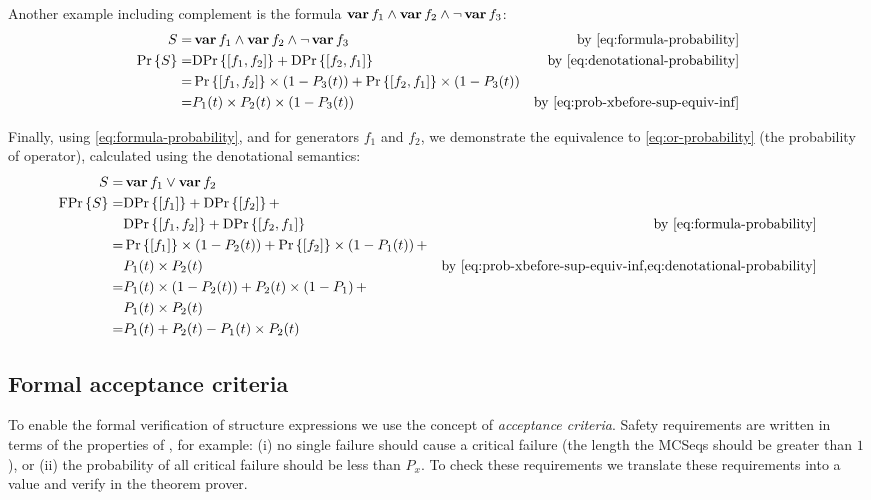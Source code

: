 \documentclass[12pt,openright,twoside,a4paper,oldfontcommands,english,brazil,final]{abntex2}
\theoremstyle{theo}
\def\varop{\ensuremath\operatorname{\mathbf{var}}}
\newcommand{\var}[1]{\ensuremath\varop #1}
\def\probabilityop{\ensuremath \Pr}
\newcommand{\probability}[1]{\ensuremath \probabilityop\left\{#1\right\}}
\def\denotationalprobop{\ensuremath\mathrm{DPr}}
\newcommand{\denotationalprob}[1]{\ensuremath \denotationalprobop\left\{#1\right\}}
\def\formulaprobop{\ensuremath\mathrm{FPr}}
\newcommand{\formulaprob}[1]{\ensuremath \formulaprobop\left\{#1\right\}}
\newcommand{\vari}[1]{\ensuremath\var{f_{#1}}}
\begin{document}
Another example including complement is the formula $\var{f_1} \land \var{f_2} \land \lnot \var{f_3}$:
%
\begin{align}
S = & \var{f_1} \land \var{f_2} \land \lnot \var{f_3}
  & \text{by \cref{eq:formula-probability}}\nonumber\\
\probability{S} = &
\denotationalprob{\left[f_1,f_2\right]} + \denotationalprob{\left[f_2,f_1\right]} 
  & \text{by \cref{eq:denotational-probability}}\nonumber\\
= & \probability{\left[f_1,f_2\right]}\times \left(1 - P_3(t)\right)
+ \probability{\left[f_2,f_1\right]}\times \left(1 - P_3(t)\right)\nonumber\\
= & P_1(t) \times P_2(t) \times \left(1 - P_3(t)\right) & \text{by \cref{eq:prob-xbefore-sup-equiv-inf}}
\end{align}

Finally, using \cref{eq:formula-probability}, and for generators $f_1$ and $f_2$, we demonstrate the equivalence to \cref{eq:or-probability} (the probability of  operator), calculated using the denotational semantics:
%
\begin{align}
S = & \vari{1} \lor \vari{2}\nonumber\\
\formulaprob{S} = & \denotationalprob{\left[f_1\right]} +
  \denotationalprob{\left[f_2\right]} + \nonumber\\
  & \denotationalprob{\left[f_1,f_2\right]} +
  \denotationalprob{\left[f_2,f_1\right]}
  & \text{by \cref{eq:formula-probability}}
\nonumber\\
= &\probability{\left[f_1\right]}\times\left(1 - P_2(t)\right) + 
\probability{\left[f_2\right]}\times\left(1 - P_1(t)\right) +\nonumber\\
&P_1(t) \times P_2(t) & \text{by \cref{eq:prob-xbefore-sup-equiv-inf,eq:denotational-probability}}\nonumber\\
= & P_1(t) \times \left(1 - P_2(t)\right) + P_2(t) \times \left(1 - P_1\right) + \nonumber\\
  & P_1(t) \times P_2(t)\nonumber\\
= & P_1(t) + P_2(t) - P_1(t) \times P_2(t)
\end{align}

\subsection{Formal acceptance criteria}
\label{sec:formal-acceptance-criteria}

To enable the formal verification of structure expressions we use the concept of \emph{acceptance criteria}.
Safety requirements are written in terms of the properties of , for example: (i) no single failure should cause a critical failure (the length the \acp{MCSeq} should be greater than $1$), or (ii) the probability of all critical failure should be less than $P_x$.
To check these requirements we translate these requirements into a value and verify in the theorem prover.
\end{document}
